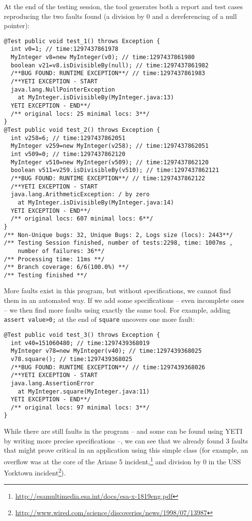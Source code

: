 At the end of the testing session, the tool generates both a report and test cases reproducing the two faults found (a division by 0 and a dereferencing of a null pointer):
{\small
\begin{verbatim}
@Test public void test_1() throws Exception {
  int v0=1; // time:1297437861978
  MyInteger v8=new MyInteger(v0); // time:1297437861980
  boolean v21=v8.isDivisibleBy(null); // time:1297437861982
  /**BUG FOUND: RUNTIME EXCEPTION**/ // time:1297437861983
  /**YETI EXCEPTION - START 
  java.lang.NullPointerException
    at MyInteger.isDivisibleBy(MyInteger.java:13)
  YETI EXCEPTION - END**/ 
  /** original locs: 25 minimal locs: 3**/
}
@Test public void test_2() throws Exception {
  int v258=6; // time:1297437862051
  MyInteger v259=new MyInteger(v258); // time:1297437862051
  int v509=0; // time:1297437862120
  MyInteger v510=new MyInteger(v509); // time:1297437862120
  boolean v511=v259.isDivisibleBy(v510); // time:1297437862121
  /**BUG FOUND: RUNTIME EXCEPTION**/ // time:1297437862122
  /**YETI EXCEPTION - START 
  java.lang.ArithmeticException: / by zero
    at MyInteger.isDivisibleBy(MyInteger.java:14)
  YETI EXCEPTION - END**/ 
  /** original locs: 607 minimal locs: 6**/
}
/** Non-Unique bugs: 32, Unique Bugs: 2, Logs size (locs): 2443**/
/** Testing Session finished, number of tests:2298, time: 1007ms , 
    number of failures: 36**/
/** Processing time: 11ms **/
/** Branch coverage: 6/6(100.0%) **/
/** Testing finished **/
\end{verbatim}
}

More faults exist in this program, but without specifications, we cannot find them in an automated way.
If we add some specifications -- even incomplete ones -- we then find more faults using exactly the same tool.
For example, adding \verb+assert value>0;+ at the end of \verb+square+ uncovers one more fault:

{\small
\begin{verbatim}
@Test public void test_3() throws Exception {
  int v40=151060480; // time:1297439368019
  MyInteger v78=new MyInteger(v40); // time:1297439368025
  v78.square(); // time:1297439368025
  /**BUG FOUND: RUNTIME EXCEPTION**/ // time:1297439368026
  /**YETI EXCEPTION - START 
  java.lang.AssertionError
    at MyInteger.square(MyInteger.java:11)
  YETI EXCEPTION - END**/ 
  /** original locs: 97 minimal locs: 3**/
}
\end{verbatim}
}

While there are still faults in the program -- and some can be found using YETI by writing more precise specifications --, we can see that we already found 3 faults that might prove critical in an application using this simple class (for example, an overflow was at the core of the Ariane 5 incident,\footnote{\url{http://esamultimedia.esa.int/docs/esa-x-1819eng.pdf}} and division by 0 in the USS Yorktown incident\footnote{\url{http://www.wired.com/science/discoveries/news/1998/07/13987}}).

